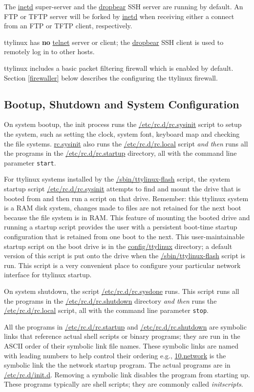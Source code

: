 \documentclass[10pt]{article}
\begin{document}
The \url{inetd} super-server and the \url{dropbear} SSH server are running by
default. An FTP or TFTP server will be forked by \url{inetd} when receiving
either a connect from an FTP or TFTP client, respectively.

ttylinux has {\bf no} \url{telnet} server or client; the \url{dropbear} SSH
client is used to remotely log in to other hosts.

ttylinux includes a basic packet filtering firewall which is enabled by
default. Section \ref{firewaller} below describes the configuring the ttylinux
firewall.

\subsection{Bootup, Shutdown and System Configuration}
\label{startup}

On system bootup, the init process runs the \url{/etc/rc.d/rc.sysinit} script
to setup the system, such as setting the clock, system font, keyboard map and
checking the file systems. \url{rc.sysinit} also runs the
\url{/etc/rc.d/rc.local} script {\it and then} runs all the programs in the
\url{/etc/rc.d/rc.startup} directory, all with the command line parameter
{\tt start}.

For ttylinux systems installed by the \url{/sbin/ttylinux-flash} script, the
system startup script \url{/etc/rc.d/rc.sysinit} attempts to find and mount the
drive that is booted from and then run a script on that drive. Remember: this
ttylinux system is a RAM disk system, changes made to files are not retained
for the next boot because the file system is in RAM. This feature of mounting
the booted drive and running a startup script provides the user with a
persistent boot-time startup configuration that is retained from one boot to
the next. This user-maintainable startup script on the boot drive is in the
\url{config/ttylinux} directory; a default version of this script is put onto
the drive when the \url{/sbin/ttylinux-flash} script is run. This script is a
very convenient place to configure your particular network interface for
ttylinux startup.

On system shutdown, the script \url{/etc/rc.d/rc.sysdone} runs. This script
runs all the programs in the \url{/etc/rc.d/rc.shutdown} directory {\it and
then} runs the \url{/etc/rc.d/rc.local} script, all with the command line
parameter {\tt stop}.

All the programs in \url{/etc/rc.d/rc.startup} and \url{/etc/rc.d/rc.shutdown}
are symbolic links that reference actual shell scripts or binary programs; they
are run in the ASCII order of their symbolic link file names. These symbolic
links are named with leading numbers to help control their ordering e.g.,
\url{10.network} is the symbolic link the the network startup program. The
actual programs are in \url{/etc/rc.d/init.d}. Removing a symbolic link
disables the program from starting up. These programs typically are shell
scripts; they are commonly called {\it initscripts}.
\end{document}
